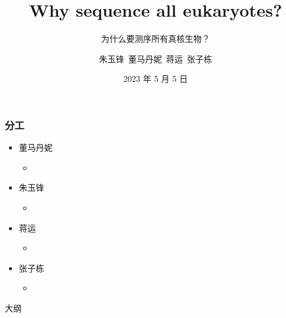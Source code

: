 \documentclass{beamer}
\author[朱玉锋~董马丹妮~蒋运~张子栋]{朱玉锋~董马丹妮~蒋运~张子栋}
\title[Why sequence all eukaryotes?]{Why sequence all eukaryotes?}
\subtitle{为什么要测序所有真核生物？}
\institute[Group 7]{华中农业大学
	
	信息学院}
\date[2023 年 5 月 5 日]{2023 年 5 月 5 日}
\begin{document}
	\kaishu
	
	\frame{\titlepage}


	\begin{frame}
		\frametitle{分工}
	
		\begin{itemize}
			\item 董马丹妮
			\begin{itemize}
				\item 
			\end{itemize}
			
			\item 朱玉锋
			\begin{itemize}
				\item 
			\end{itemize}
			
			\item 蒋运
			\begin{itemize}
				\item 
			\end{itemize}
			
			\item 张子栋
			\begin{itemize}
				\item 
			\end{itemize}
		\end{itemize}
		
	\end{frame}


\begin{frame}{大纲}
	\begin{multicols}{2}
	\tableofcontents
	\end{multicols}
\end{frame}
	
\end{document}
